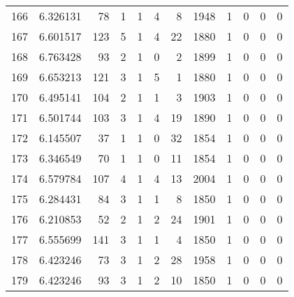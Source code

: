\begin{tabular}{lrrrrrrrrrrr}
166 &  6.326131 &   78 &      1 &        1 &      4 &               8 &  1948 &               1 &               0 &               0 &               0 \\
167 &  6.601517 &  123 &      5 &        1 &      4 &              22 &  1880 &               1 &               0 &               0 &               0 \\
168 &  6.763428 &   93 &      2 &        1 &      0 &               2 &  1899 &               1 &               0 &               0 &               0 \\
169 &  6.653213 &  121 &      3 &        1 &      5 &               1 &  1880 &               1 &               0 &               0 &               0 \\
170 &  6.495141 &  104 &      2 &        1 &      1 &               3 &  1903 &               1 &               0 &               0 &               0 \\
171 &  6.501744 &  103 &      3 &        1 &      4 &              19 &  1890 &               1 &               0 &               0 &               0 \\
172 &  6.145507 &   37 &      1 &        1 &      0 &              32 &  1854 &               1 &               0 &               0 &               0 \\
173 &  6.346549 &   70 &      1 &        1 &      0 &              11 &  1854 &               1 &               0 &               0 &               0 \\
174 &  6.579784 &  107 &      4 &        1 &      4 &              13 &  2004 &               1 &               0 &               0 &               0 \\
175 &  6.284431 &   84 &      3 &        1 &      1 &               8 &  1850 &               1 &               0 &               0 &               0 \\
176 &  6.210853 &   52 &      2 &        1 &      2 &              24 &  1901 &               1 &               0 &               0 &               0 \\
177 &  6.555699 &  141 &      3 &        1 &      1 &               4 &  1850 &               1 &               0 &               0 &               0 \\
178 &  6.423246 &   73 &      3 &        1 &      2 &              28 &  1958 &               1 &               0 &               0 &               0 \\
179 &  6.423246 &   93 &      3 &        1 &      2 &              10 &  1850 &               1 &               0 &               0 &               0 \\

\end{tabular}
